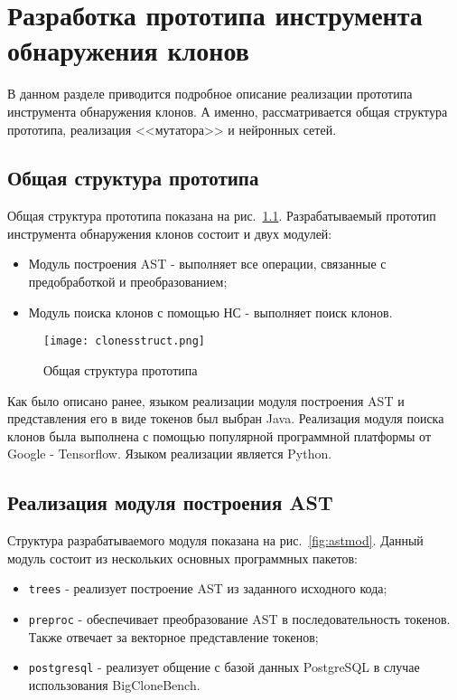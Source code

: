 \chapter{Разработка прототипа инструмента обнаружения клонов}

В данном разделе приводится подробное описание реализации прототипа инструмента обнаружения клонов. А именно, рассматривается общая структура прототипа, реализация <<мутатора>> и нейронных сетей.

\section{Общая структура прототипа}

Общая структура прототипа показана на рис.~\ref{fig:clones_prot}. Разрабатываемый прототип инструмента обнаружения клонов состоит и двух модулей:
\begin{itemize}
\setlength\itemsep{0mm}
\item Модуль построения AST - выполняет все операции, связанные с предобработкой и преобразованием;
\item Модуль поиска клонов с помощью НС - выполняет поиск клонов.
\end{itemize}

\begin{figure}[htbp]
\centering
\texttt{[image: clonesstruct.png]}
\caption{Общая структура прототипа}
\label{fig:clones_prot}
\end{figure}

Как было описано ранее, языком реализации модуля построения AST и представления его в виде токенов был выбран Java. Реализация модуля поиска клонов была выполнена с помощью популярной программной платформы от Google -  Tensorflow. Языком реализации является Python.

\section{Реализация модуля построения AST}

Структура разрабатываемого модуля показана на рис.~\ref{fig:astmod}. Данный модуль состоит из нескольких основных программных пакетов:

\begin{itemize}
\setlength\itemsep{0mm}
\item \texttt{trees} - реализует построение AST из заданного исходного кода;
\item \texttt{preproc} - обеспечивает преобразование AST в последовательность токенов. Также отвечает за векторное представление токенов;
\item \texttt{postgresql} - реализует общение с базой данных PostgreSQL в случае использования BigCloneBench.
\end{itemize}


